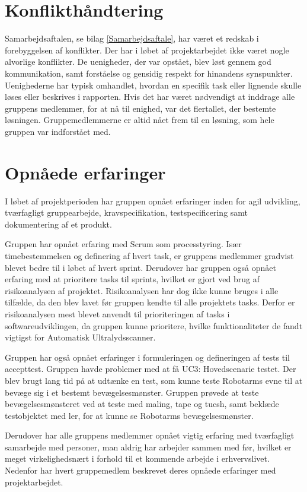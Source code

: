 \section{Konflikthåndtering}
Samarbejdsaftalen, se bilag \ref{Samarbejdsaftale}, har været et redskab i forebyggelsen af konflikter. Der har i løbet af projektarbejdet ikke været nogle alvorlige konflikter. De uenigheder, der var opstået, blev løst gennem god kommunikation, samt forståelse og gensidig respekt for hinandens synspunkter. Uenighederne har typisk omhandlet, hvordan en specifik task eller lignende skulle løses eller beskrives i rapporten. Hvis det har været nødvendigt at inddrage alle gruppens medlemmer, for at nå til enighed, var det flertallet, der bestemte løsningen. Gruppemedlemmerne er altid nået frem til en løsning, som hele gruppen var indforstået med.

\section{Opnåede erfaringer}
I løbet af projektperioden har gruppen opnået erfaringer inden for agil udvikling, tværfagligt gruppearbejde, kravspecifikation, testspecificering samt dokumentering af et produkt.

Gruppen har opnået erfaring med Scrum som processtyring. Især timebestemmelsen og definering af hvert task, er gruppens medlemmer gradvist blevet bedre til i løbet af hvert sprint. Derudover har gruppen også opnået erfaring med at prioritere tasks til sprints, hvilket er gjort ved brug af risikoanalysen af projektet. Risikoanalysen har dog ikke kunne bruges i alle tilfælde, da den blev lavet før gruppen kendte til alle projektets tasks. Derfor er risikoanalysen mest blevet anvendt til prioriteringen af tasks i softwareudviklingen, da gruppen kunne prioritere, hvilke funktionaliteter de fandt vigtigst for Automatisk Ultralydsscanner. 

Gruppen har også opnået erfaringer i formuleringen og defineringen af tests til accepttest. Gruppen havde problemer med at få UC3: Hovedscenarie testet. Der blev brugt lang tid på at udtænke en test, som kunne teste Robotarms evne til at bevæge sig i et bestemt bevægelsesmønster. Gruppen prøvede at teste bevægelsesmønsteret ved at teste med maling, tape og tucsh, samt beklæde testobjektet med ler, for at kunne se Robotarms bevægelsesmønster. 

Derudover har alle gruppens medlemmer opnået vigtig erfaring med tværfagligt samarbejde med personer, man aldrig har arbejder sammen med før, hvilket er meget virkelighedsnært i forhold til et kommende arbejde i erhvervslivet.
Nedenfor har hvert gruppemedlem beskrevet deres opnåede erfaringer med projektarbejdet. 

